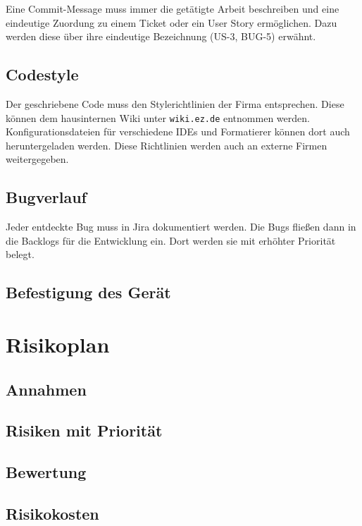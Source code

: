 Eine Commit-Message muss immer die getätigte Arbeit beschreiben und eine eindeutige Zuordung zu einem Ticket oder ein User Story ermöglichen. Dazu werden diese über ihre eindeutige Bezeichnung (US-3, BUG-5) erwähnt.
\subsection{Codestyle}
Der geschriebene Code muss den Stylerichtlinien der Firma entsprechen. Diese können dem hausinternen Wiki unter \texttt{wiki.ez.de} entnommen werden. Konfigurationsdateien für verschiedene IDEs und Formatierer können dort auch heruntergeladen werden. Diese Richtlinien werden auch an externe Firmen weitergegeben. 
\subsection{Bugverlauf}
Jeder entdeckte Bug muss in Jira dokumentiert werden. Die Bugs fließen dann in die Backlogs für die Entwicklung ein. Dort werden sie mit erhöhter Priorität belegt.


\subsection{Befestigung des Gerät}


\section{Risikoplan}
\subsection{Annahmen} %


\subsection{Risiken mit Priorität} %


\subsection{Bewertung } %


\subsection{Risikokosten}


